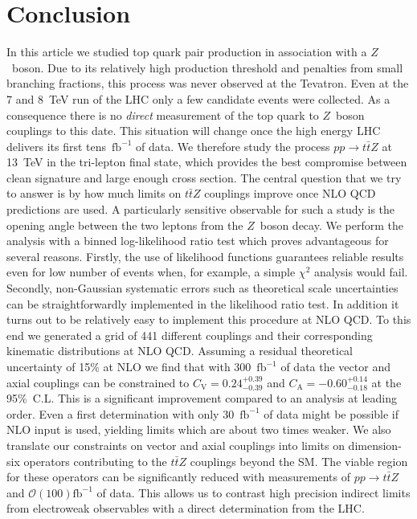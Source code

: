 \documentclass{JHEP3}
\def\ttbZ{t\bar{t}Z}
\def\invfb {\mathrm{fb}^{-1}}
\begin{document}
\section{Conclusion}
In this article we studied top quark pair production in association with a $Z$~boson.
Due to its relatively high production threshold and 
penalties from small branching fractions, 
this process was never observed at the Tevatron.
Even at the 7 and 8~TeV run of the LHC only a few candidate events were collected.
As a consequence there is no {\it direct} measurement of the top quark to $Z$~boson couplings to this date. 
This situation will change once the high energy LHC delivers its first tens~$\invfb$ of data.
We therefore study the process $pp\to\ttbZ$ at 13~TeV in the tri-lepton final state,   
which provides the best compromise between clean signature and large enough cross section. 
The central question that we try to answer is by how much limits on
$\ttbZ$ couplings improve once NLO QCD predictions are used.
A particularly sensitive observable for such a study is the opening angle between the two leptons from the $Z$~boson decay.
We perform the analysis with a binned log-likelihood ratio test which proves advantageous for several reasons.
Firstly, the use of likelihood functions guarantees reliable results even for low number of events when, for example, a simple $\chi^2$ analysis would fail.
Secondly, non-Gaussian systematic errors such as theoretical scale uncertainties can be straightforwardly implemented in the likelihood ratio test.
In addition it turns out to be relatively easy to implement this procedure at NLO QCD.
To this end we generated a grid of 441 different couplings and their corresponding kinematic distributions at NLO QCD. 
Assuming a residual theoretical uncertainty of 15\% at NLO we find that with 300~$\invfb$ of data the vector and axial couplings can 
be constrained to $C_\mathrm{V}=0.24^{+0.39}_{-0.39}$ and $C_\mathrm{A}=-0.60^{+0.14}_{-0.18}$ at the 95\%~C.L.
This is a significant improvement compared to an analysis at leading order.
Even a first determination with only 30~$\invfb$ of data might be possible if NLO input is used, yielding 
limits which are about two times weaker. 
We also translate our constraints on vector and axial couplings into limits on dimension-six operators contributing to the $\ttbZ$ couplings beyond the SM.
The viable region for these operators can be significantly reduced with measurements of $pp \to \ttbZ$ and $\mathcal{O}(100)\invfb$ of data.
This allows us to contrast high precision indirect limits from electroweak observables with a direct determination from the LHC.
\end{document}
